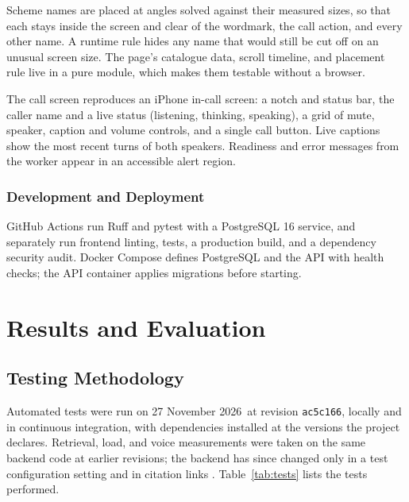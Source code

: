 \documentclass[11pt,a4paper,oneside]{report}
\newcommand{\ReportDate}{27 November 2026}
\newcommand{\Revision}{ac5c166}
\begin{document}
Scheme names are placed at angles solved against their measured sizes, so that each
stays inside the screen and clear of the wordmark, the call action, and every other
name. A runtime rule hides any name that would still be cut off on an unusual screen
size. The page's catalogue data, scroll timeline, and placement rule live in a pure
module, which makes them testable without a browser.

The call screen reproduces an iPhone in-call screen: a notch and status bar, the
caller name and a live status (listening, thinking, speaking), a grid of mute,
speaker, caption and volume controls, and a single call button. Live captions show
the most recent turns of both speakers. Readiness and error messages from the
worker appear in an accessible alert region.

\subsection{Development and Deployment}
GitHub Actions run Ruff and pytest with a PostgreSQL 16 service, and separately run
frontend linting, tests, a production build, and a dependency security audit. Docker Compose defines PostgreSQL
and the API with health checks; the API container applies migrations before
starting.

\chapter{Results and Evaluation}

\section{Testing Methodology}
Automated tests were run on \ReportDate\ at revision \texttt{\Revision}, locally
and in continuous integration, with dependencies installed at the versions the
project declares. Retrieval, load, and voice measurements were taken on the same
backend code at earlier revisions; the backend has since changed only in a test
configuration setting and in citation links
\cite{implementation}. Table~\ref{tab:tests} lists the tests performed.
\end{document}
